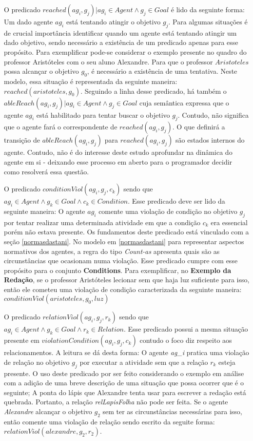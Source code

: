 O predicado $reached(ag_i,g_j) | ag_i \in Agent \wedge g_j \in Goal $ é lido da seguinte forma: Um dado agente $ag_i$ está tentando atingir o objetivo $g_j$. Para algumas situações é de crucial importância identificar quando um agente está tentando atingir um dado objetivo, sendo necessário a existência de um predicado apenas para esse propósito. Para exemplificar pode-se considerar o exemplo presente no quadro do professor Aristóteles com o seu aluno Alexandre. Para que o professor $Aristoteles$ possa alcançar o objetivo $g_0$, é necessário a existência de uma tentativa. Neste modelo, essa situação é representada da seguinte maneira: $reached(aristoteles,g_0)$. Seguindo a linha desse predicado, há também o $ableReach(ag_i,g_j) | ag_i \in Agent \wedge g_j \in Goal$ cuja semântica expressa que o agente $ag_i$ está habilitado para tentar buscar o objetivo $g_j$. Contudo, não significa que o agente fará o correspondente de $reached(ag_i,g_j)$. O que definirá a transição de $ableReach(ag_i,g_j)$ para $reached(ag_i,g_j)$ são estados internos do agente. Contudo, não é do interesse deste estudo aprofundar na dinâmica do agente em si - deixando esse processo em aberto para o programador decidir como resolverá essa questão.

O predicado $ conditionViol(ag_i,g_j,c_k) $ sendo que $ ag_i \in Agent \wedge g_k \in Goal \wedge c_k \in Condition$. Esse predicado deve ser lido da seguinte maneira: O agente $ag_i$ comente uma violação de condição no objetivo $g_j$ por tentar realizar uma determinada atividade em que a condição $c_k$ era essencial porém não estava presente. Os fundamentos deste predicado está vinculado com a seção \ref{normasdastani}. No modelo em \ref{normasdastani} para representar aspectos normativos dos agentes, a regra do tipo \textit{Count-as} apresenta quais são as circunstâncias que ocasionam numa violação. Esse predicado cumpre com esse propósito para o conjunto \textbf{Conditions}. Para exemplificar, no \textbf{Exemplo da Redação}, se o professor Aristóteles lecionar sem que haja luz suficiente para isso, então ele cometeu uma violação de condição caracterizada da seguinte maneira: $conditionViol(aristoteles,g_0,luz)$

O predicado $ relationViol(ag_i,g_j,r_k) $ sendo que $ ag_i \in Agent \wedge g_k \in Goal \wedge r_k \in Relation $. Esse predicado possui a mesma situação presente em $ violationCondition(ag_i,g_j,c_k) $ contudo o foco diz respeito aos relacionamentos. A leitura se dá desta forma: O agente \textit{ag\_i} pratica uma violação de relação no objetivo $g_j$ por executar a atividade sem que a relação $r_k$ esteja presente. O uso deste predicado por ser feito considerando o exemplo em análise com a adição de uma breve descrição de uma situação que possa ocorrer que é o seguinte; A ponta do lápis que Alexandre tenta usar para escrever a redação está quebrada. Portanto, a relação \textit{relLapisFolha} não pode ser feita. Se o agente \textit{Alexandre} alcançar o objetivo $g_2$ sem ter as circunstâncias necessárias para isso, então comente uma violação de relação sendo escrito da seguite forma: $relationViol(alexandre,g_2,r_2)$.

